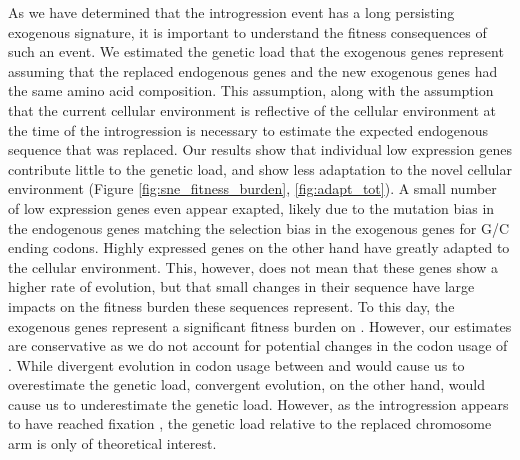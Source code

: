 \documentclass[12pt]{article}
\begin{document}
As we have determined that the introgression event has a long persisting exogenous signature, it is important to understand the fitness consequences of such an event.
We estimated the genetic load that the exogenous genes represent assuming that the replaced endogenous genes and the new exogenous genes had the same amino acid composition.
This assumption, along with the assumption that the current \kluyveri cellular environment is reflective of the cellular environment at the time of the introgression is necessary to estimate the expected endogenous sequence that was replaced.
Our results show that individual low expression genes contribute little to the genetic load, and show less adaptation to the novel cellular environment (Figure \ref{fig:sne_fitness_burden}, \ref{fig:adapt_tot}).
A small number of low expression genes even appear exapted, likely due to the mutation bias in the endogenous genes matching the selection bias in the exogenous genes for G/C ending codons.
Highly expressed genes on the other hand have greatly adapted to the \kluyveri cellular environment.
This, however, does not mean that these genes show a higher rate of evolution, but that small changes in their sequence have large impacts on the fitness burden these sequences represent.
To this day, the exogenous genes represent a significant fitness burden on \kluyveri.
However, our estimates are conservative as we do not account for potential changes in the codon usage of \gossypii. 
While divergent evolution in codon usage between \gossypii and \kluyveri would cause us to overestimate the genetic load, convergent evolution, on the other hand, would cause us to underestimate the genetic load.
However, as the introgression appears to have reached fixation \citep{friedrich2015}, the genetic load relative to the replaced chromosome arm is only of theoretical interest.
\end{document}
